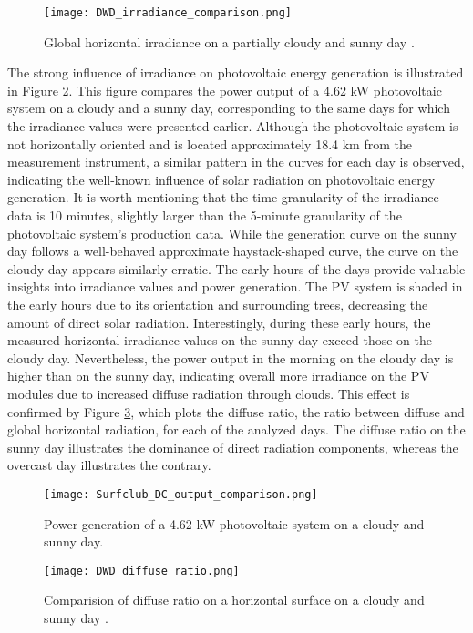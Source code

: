 \begin{figure}
    \centering
    \texttt{[image: DWD\_irradiance\_comparison.png]}
    \caption{\small Global horizontal irradiance on a partially cloudy and sunny day \cite{DWD_weiherstephan_irradiance}.}
    \label{fig:DWD_irradiance_comparison}
\end{figure}

The strong influence of irradiance on photovoltaic energy generation is illustrated in Figure
\ref{fig:Surfclub_DC_output_comparison}. This figure compares the power output of a 4.62 kW
photovoltaic system on a cloudy and a sunny day, corresponding to the same days for which the
irradiance values were presented earlier. Although the photovoltaic system is not horizontally
oriented and is located approximately 18.4 km from the measurement instrument, a similar
pattern in the curves for each day is observed, indicating the well-known influence of solar
radiation on photovoltaic energy generation. It is worth mentioning that the time granularity
of the irradiance data is 10 minutes, slightly larger than the 5-minute granularity of the
photovoltaic system's production data. While the generation curve on the sunny day follows
a well-behaved approximate haystack-shaped curve, the curve on the cloudy day appears similarly
erratic. The early hours of the days provide valuable insights into irradiance values and power generation.
The PV system is shaded in the early hours due to its orientation and surrounding trees, decreasing
the amount of direct solar radiation. Interestingly, during these early hours, the measured horizontal
irradiance values on the sunny day exceed those on the cloudy day. Nevertheless, the power output in
the morning on the cloudy day is higher than on the sunny day, indicating overall more irradiance on
the PV modules due to increased diffuse radiation through clouds. This effect is confirmed by Figure
\ref{fig:DWD_diffuse_ratio}, which plots the diffuse ratio, the ratio between diffuse and global horizontal
radiation, for each of the analyzed days. The diffuse ratio on the sunny day illustrates the dominance
of direct radiation components, whereas the overcast day illustrates the contrary.

\begin{figure}
    \centering
    \texttt{[image: Surfclub\_DC\_output\_comparison.png]}
    \caption{\small Power generation of a 4.62 kW photovoltaic system on a cloudy and sunny day.}
    \label{fig:Surfclub_DC_output_comparison}
\end{figure}


\begin{figure}
    \centering
    \texttt{[image: DWD\_diffuse\_ratio.png]}
    \caption{\small Comparision of diffuse ratio on a horizontal surface on a cloudy and sunny day \cite{DWD_weiherstephan_irradiance}.}
    \label{fig:DWD_diffuse_ratio}
\end{figure}